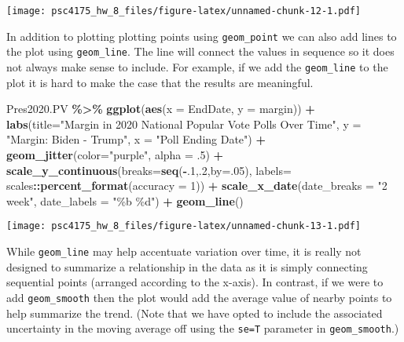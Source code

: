 \documentclass[
]{article}
\newenvironment{Shaded}{\begin{snugshade}}{\end{snugshade}}
\newcommand{\AttributeTok}[1]{\textcolor[rgb]{0.13,0.29,0.53}{#1}}
\newcommand{\DecValTok}[1]{\textcolor[rgb]{0.00,0.00,0.81}{#1}}
\newcommand{\FunctionTok}[1]{\textcolor[rgb]{0.13,0.29,0.53}{\textbf{#1}}}
\newcommand{\NormalTok}[1]{#1}
\newcommand{\SpecialCharTok}[1]{\textcolor[rgb]{0.81,0.36,0.00}{\textbf{#1}}}
\newcommand{\StringTok}[1]{\textcolor[rgb]{0.31,0.60,0.02}{#1}}
\begin{document}
\texttt{[image: psc4175\_hw\_8\_files/figure-latex/unnamed-chunk-12-1.pdf]}

In addition to plotting plotting points using \texttt{geom\_point} we
can also add lines to the plot using \texttt{geom\_line}. The line will
connect the values in sequence so it does not always make sense to
include. For example, if we add the \texttt{geom\_line} to the plot it
is hard to make the case that the results are meaningful.

\begin{Shaded}
\begin{Highlighting}[]
\NormalTok{Pres2020.PV }\SpecialCharTok{\%\textgreater{}\%}
  \FunctionTok{ggplot}\NormalTok{(}\FunctionTok{aes}\NormalTok{(}\AttributeTok{x =}\NormalTok{ EndDate, }\AttributeTok{y =}\NormalTok{ margin)) }\SpecialCharTok{+} 
  \FunctionTok{labs}\NormalTok{(}\AttributeTok{title=}\StringTok{"Margin in 2020 National Popular Vote Polls Over Time"}\NormalTok{,}
       \AttributeTok{y =} \StringTok{"Margin: Biden {-} Trump"}\NormalTok{,}
       \AttributeTok{x =} \StringTok{"Poll Ending Date"}\NormalTok{) }\SpecialCharTok{+} 
    \FunctionTok{geom\_jitter}\NormalTok{(}\AttributeTok{color=}\StringTok{"purple"}\NormalTok{, }\AttributeTok{alpha =}\NormalTok{ .}\DecValTok{5}\NormalTok{) }\SpecialCharTok{+} 
    \FunctionTok{scale\_y\_continuous}\NormalTok{(}\AttributeTok{breaks=}\FunctionTok{seq}\NormalTok{(}\SpecialCharTok{{-}}\NormalTok{.}\DecValTok{1}\NormalTok{,.}\DecValTok{2}\NormalTok{,}\AttributeTok{by=}\NormalTok{.}\DecValTok{05}\NormalTok{),}
                     \AttributeTok{labels=}\NormalTok{ scales}\SpecialCharTok{::}\FunctionTok{percent\_format}\NormalTok{(}\AttributeTok{accuracy =} \DecValTok{1}\NormalTok{)) }\SpecialCharTok{+}
    \FunctionTok{scale\_x\_date}\NormalTok{(}\AttributeTok{date\_breaks =} \StringTok{"2 week"}\NormalTok{, }\AttributeTok{date\_labels =} \StringTok{"\%b \%d"}\NormalTok{) }\SpecialCharTok{+}
  \FunctionTok{geom\_line}\NormalTok{()}
\end{Highlighting}
\end{Shaded}

\texttt{[image: psc4175\_hw\_8\_files/figure-latex/unnamed-chunk-13-1.pdf]}

While \texttt{geom\_line} may help accentuate variation over time, it is
really not designed to summarize a relationship in the data as it is
simply connecting sequential points (arranged according to the x-axis).
In contrast, if we were to add \texttt{geom\_smooth} then the plot would
add the average value of nearby points to help summarize the trend.
(Note that we have opted to include the associated uncertainty in the
moving average off using the \texttt{se=T} parameter in
\texttt{geom\_smooth}.)
\end{document}
